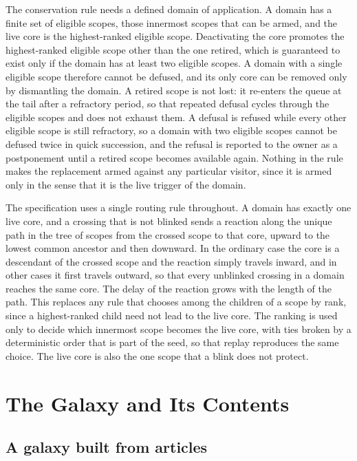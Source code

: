 \documentclass[11pt]{article}
\begin{document}
The conservation rule needs a defined domain of application. A domain has a finite set of eligible scopes, those innermost scopes that can be armed, and the live core is the highest-ranked eligible scope. Deactivating the core promotes the highest-ranked eligible scope other than the one retired, which is guaranteed to exist only if the domain has at least two eligible scopes. A domain with a single eligible scope therefore cannot be defused, and its only core can be removed only by dismantling the domain. A retired scope is not lost: it re-enters the queue at the tail after a refractory period, so that repeated defusal cycles through the eligible scopes and does not exhaust them. A defusal is refused while every other eligible scope is still refractory, so a domain with two eligible scopes cannot be defused twice in quick succession, and the refusal is reported to the owner as a postponement until a retired scope becomes available again. Nothing in the rule makes the replacement armed against any particular visitor, since it is armed only in the sense that it is the live trigger of the domain.

The specification uses a single routing rule throughout. A domain has exactly one live core, and a crossing that is not blinked sends a reaction along the unique path in the tree of scopes from the crossed scope to that core, upward to the lowest common ancestor and then downward. In the ordinary case the core is a descendant of the crossed scope and the reaction simply travels inward, and in other cases it first travels outward, so that every unblinked crossing in a domain reaches the same core. The delay of the reaction grows with the length of the path. This replaces any rule that chooses among the children of a scope by rank, since a highest-ranked child need not lead to the live core. The ranking is used only to decide which innermost scope becomes the live core, with ties broken by a deterministic order that is part of the seed, so that replay reproduces the same choice. The live core is also the one scope that a blink does not protect.

\section{The Galaxy and Its Contents}
\label{sec:galaxy}

\subsection{A galaxy built from articles}
\end{document}
